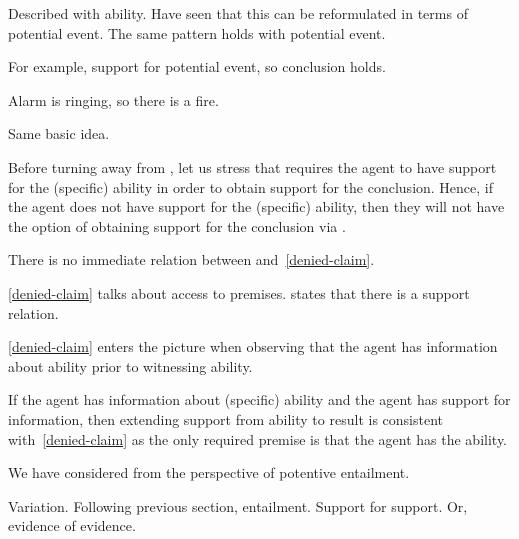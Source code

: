 \begin{note}
  Described \AR{} with ability.
  Have seen that this can be reformulated in terms of potential event.
  The same pattern holds with potential event.

  For example, support for potential event, so conclusion holds.
\end{note}

\begin{note}
  Alarm is ringing, so there is a fire.

  Same basic idea.
\end{note}

\begin{note}
  Before turning away from \AR{}, let us stress that \AR{} requires the agent to have support for the (specific) ability in order to obtain support for the conclusion.
  Hence, if the agent does not have support for the (specific) ability, then they will not have the option of obtaining support for the conclusion via \AR{}.
\end{note}

\begin{note}
  There is no immediate relation between \AR{} and~\ref{denied-claim}.

  \ref{denied-claim} talks about access to premises.
  \AR{} states that there is a support relation.

  \ref{denied-claim} enters the picture when observing that the agent has information about ability prior to witnessing ability.

  If the agent has information about (specific) ability and the agent has support for information, then extending support from ability to result is consistent with~\ref{denied-claim} as the only required premise is that the agent has the ability.
\end{note}

\begin{note}
  We have considered \AR{} from the perspective of potentive entailment.

  Variation.
  Following previous section, entailment.
  Support for support.
  Or, evidence of evidence.
\end{note}

